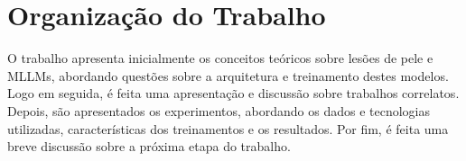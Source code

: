 \section{Organização do Trabalho}

O trabalho apresenta inicialmente os conceitos teóricos sobre lesões de pele e \acp{MLLM}, abordando questões sobre a arquitetura e treinamento destes modelos. Logo
em seguida, é feita uma apresentação e discussão sobre trabalhos correlatos. Depois, são apresentados os experimentos, abordando os dados e tecnologias utilizadas,
características dos treinamentos e os resultados. Por fim, é feita uma breve discussão sobre a próxima etapa do trabalho.
